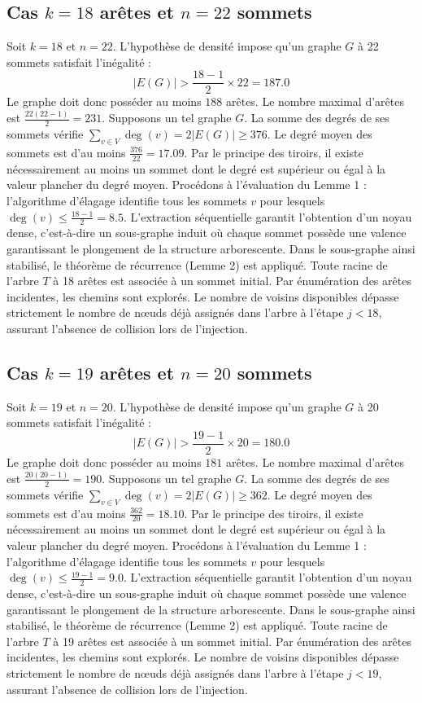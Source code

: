 \documentclass[12pt,a4paper]{article}
\begin{document}
\subsection{Cas $k = 18$ arêtes et $n = 22$ sommets}
Soit $k = 18$ et $n = 22$. L'hypothèse de densité impose qu'un graphe $G$ à 22 sommets satisfait l'inégalité :
$$ |E(G)| > \frac{18-1}{2} \times 22 = 187.0 $$
Le graphe doit donc posséder au moins $188$ arêtes. Le nombre maximal d'arêtes est $\frac{22(22-1)}{2} = 231$.
Supposons un tel graphe $G$. La somme des degrés de ses sommets vérifie $\sum_{v \in V} \deg(v) = 2|E(G)| \geq 376$.
Le degré moyen des sommets est d'au moins $\frac{376}{22} = 17.09$.
Par le principe des tiroirs, il existe nécessairement au moins un sommet dont le degré est supérieur ou égal à la valeur plancher du degré moyen.
Procédons à l'évaluation du Lemme 1 : l'algorithme d'élagage identifie tous les sommets $v$ pour lesquels $\deg(v) \leq \frac{18-1}{2} = 8.5$.
L'extraction séquentielle garantit l'obtention d'un noyau dense, c'est-à-dire un sous-graphe induit où chaque sommet possède une valence garantissant le plongement de la structure arborescente.
Dans le sous-graphe ainsi stabilisé, le théorème de récurrence (Lemme 2) est appliqué. Toute racine de l'arbre $T$ à 18 arêtes est associée à un sommet initial. Par énumération des arêtes incidentes, les chemins sont explorés. Le nombre de voisins disponibles dépasse strictement le nombre de nœuds déjà assignés dans l'arbre à l'étape $j < 18$, assurant l'absence de collision lors de l'injection.

\subsection{Cas $k = 19$ arêtes et $n = 20$ sommets}
Soit $k = 19$ et $n = 20$. L'hypothèse de densité impose qu'un graphe $G$ à 20 sommets satisfait l'inégalité :
$$ |E(G)| > \frac{19-1}{2} \times 20 = 180.0 $$
Le graphe doit donc posséder au moins $181$ arêtes. Le nombre maximal d'arêtes est $\frac{20(20-1)}{2} = 190$.
Supposons un tel graphe $G$. La somme des degrés de ses sommets vérifie $\sum_{v \in V} \deg(v) = 2|E(G)| \geq 362$.
Le degré moyen des sommets est d'au moins $\frac{362}{20} = 18.10$.
Par le principe des tiroirs, il existe nécessairement au moins un sommet dont le degré est supérieur ou égal à la valeur plancher du degré moyen.
Procédons à l'évaluation du Lemme 1 : l'algorithme d'élagage identifie tous les sommets $v$ pour lesquels $\deg(v) \leq \frac{19-1}{2} = 9.0$.
L'extraction séquentielle garantit l'obtention d'un noyau dense, c'est-à-dire un sous-graphe induit où chaque sommet possède une valence garantissant le plongement de la structure arborescente.
Dans le sous-graphe ainsi stabilisé, le théorème de récurrence (Lemme 2) est appliqué. Toute racine de l'arbre $T$ à 19 arêtes est associée à un sommet initial. Par énumération des arêtes incidentes, les chemins sont explorés. Le nombre de voisins disponibles dépasse strictement le nombre de nœuds déjà assignés dans l'arbre à l'étape $j < 19$, assurant l'absence de collision lors de l'injection.
\end{document}

